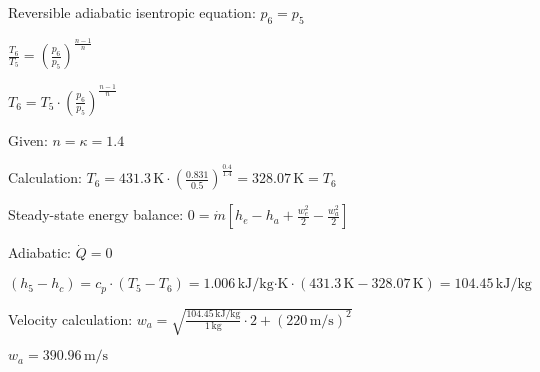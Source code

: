 Reversible adiabatic isentropic equation:  
\( p_6 = p_5 \)  

\( \frac{T_6}{T_5} = \left( \frac{p_6}{p_5} \right)^{\frac{n-1}{n}} \)  

\( T_6 = T_5 \cdot \left( \frac{p_6}{p_5} \right)^{\frac{n-1}{n}} \)  

Given: \( n = \kappa = 1.4 \)  

Calculation:  
\( T_6 = 431.3 \, \text{K} \cdot \left( \frac{0.831}{0.5} \right)^{\frac{0.4}{1.4}} = 328.07 \, \text{K} = T_6 \)  

Steady-state energy balance:  
\( 0 = \dot{m} \left[ h_e - h_a + \frac{w_e^2}{2} - \frac{w_a^2}{2} \right] \)  

Adiabatic: \( \dot{Q} = 0 \)  

\( (h_5 - h_c) = c_p \cdot (T_5 - T_6) = 1.006 \, \text{kJ/kg·K} \cdot (431.3 \, \text{K} - 328.07 \, \text{K}) = 104.45 \, \text{kJ/kg} \)  

Velocity calculation:  
\( w_a = \sqrt{\frac{104.45 \, \text{kJ/kg}}{1 \, \text{kg}} \cdot 2 + (220 \, \text{m/s})^2} \)  

\( w_a = 390.96 \, \text{m/s} \)